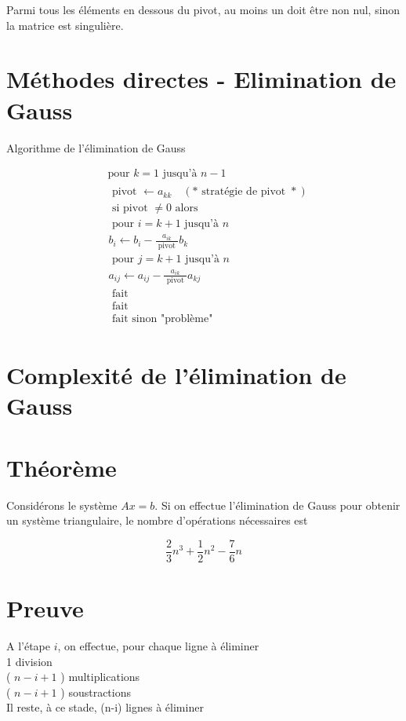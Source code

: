 \documentclass[10pt]{article}
\begin{document}
Parmi tous les éléments en dessous du pivot, au moins un doit être non nul, sinon la matrice est singulière.

\section*{Méthodes directes - Elimination de Gauss}
Algorithme de l'élimination de Gauss

\[
\begin{aligned}
& \text { pour } k=1 \text { jusqu'à } n-1 \\
& \begin{array}{l}
\text { pivot } \leftarrow a_{k k} \quad(* \text { stratégie de pivot } *) \\
\text { si pivot } \neq 0 \text { alors } \\
\text { pour } i=k+1 \text { jusqu'à } n \\
b_{i} \leftarrow b_{i}-\frac{a_{i k}}{\text { pivot }} b_{k} \\
\text { pour } j=k+1 \text { jusqu'à } n \\
a_{i j} \leftarrow a_{i j}-\frac{a_{i k}}{\text { pivot }} a_{k j} \\
\text { fait } \\
\text { fait } \\
\text { fait sinon "problème" }
\end{array}
\end{aligned}
\]

\section*{Complexité de l'élimination de Gauss}
\section*{Théorème}
Considérons le système \(A x=b\). Si on effectue l'élimination de Gauss pour obtenir un système triangulaire, le nombre d'opérations nécessaires est

\[
\frac{2}{3} n^{3}+\frac{1}{2} n^{2}-\frac{7}{6} n
\]

\section*{Preuve}
A l'étape \(i\), on effectue, pour chaque ligne à éliminer\\
1 division\\
( \(n-i+1\) ) multiplications\\
( \(n-i+1\) ) soustractions\\
Il reste, à ce stade, (n-i) lignes à éliminer
\end{document}
